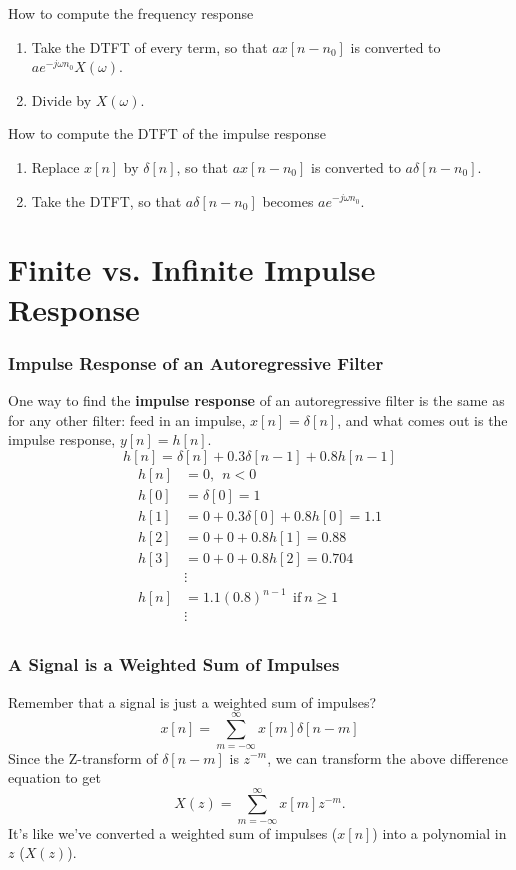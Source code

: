 \begin{frame}
  \begin{block}{How to compute the frequency response}
    \begin{enumerate}
    \item Take the DTFT of every term, so that $ax[n-n_0]$ is
      converted to $ae^{-j\omega n_0}X(\omega)$.
    \item Divide by $X(\omega)$.
    \end{enumerate}
  \end{block}

  \begin{block}{How to compute the DTFT of the impulse response}
    \begin{enumerate}
    \item Replace $x[n]$ by $\delta[n]$, so that $ax[n-n_0]$ is
      converted to $a\delta[n-n_0]$.
    \item Take the DTFT, so that $a\delta[n-n_0]$ becomes
      $ae^{-j\omega n_0}$.
    \end{enumerate}
  \end{block}
\end{frame}
  

\section[FIR and IIR]{Finite vs. Infinite Impulse Response}
\setcounter{subsection}{1}

\begin{frame}
  \frametitle{Impulse Response of an Autoregressive Filter}

  One way to find the {\bf impulse response} of an autoregressive
  filter is the same as for any other filter: feed in an impulse,
  $x[n]=\delta[n]$, and what comes out is the impulse response,
  $y[n]=h[n]$.
  \[
  h[n] = \delta[n] + 0.3\delta[n-1] + 0.8 h[n-1]
  \]
  \begin{align*}
    h[n] &= 0,~~n<0\\
    h[0] &= \delta[0] = 1\\
    h[1] &= 0 + 0.3\delta[0] + 0.8 h[0] = 1.1\\
    h[2] &= 0 + 0 + 0.8 h[1] = 0.88\\
    h[3] &= 0+ 0 + 0.8 h[2] = 0.704\\
    & \vdots\\
    h[n] &= 1.1(0.8)^{n-1}~~\mbox{if}~n\ge 1\\
    & \vdots\\
  \end{align*}
\end{frame}

\begin{frame}
  \frametitle{A Signal is a Weighted Sum of Impulses}
  
  Remember that a signal is just a weighted sum of impulses?
  \[
  x[n] = \sum_{m=-\infty}^\infty x[m]\delta[n-m]
  \]
  Since the Z-transform of $\delta[n-m]$ is $z^{-m}$, we can transform
  the above difference equation to get
  \[
  X(z) = \sum_{m=-\infty}^\infty x[m]z^{-m}.
  \]
  It's like we've converted a weighted  sum of impulses ($x[n]$)  into a
  polynomial in $z$ ($X(z)$).
\end{frame}


